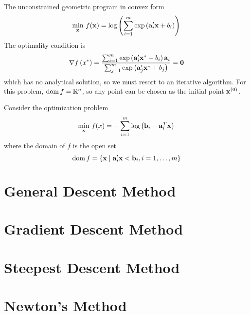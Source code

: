 \begin{example}
	The unconstrained geometric program in convex form
	\begin{equation*}
		\min_{{\bf x}}\,f({\bf x})=\log \left(\sum_{i=1}^{m}\exp\left({\bf a}_{i}^{\prime}{\bf x}+b_{i}\right)\right)
	\end{equation*}
	The optimality condition is
	\begin{equation*}
		\nabla f\left(x^{*}\right)=\frac{\sum_{i=1}^{m}\exp\left({\bf a}_{i}^{\prime}{\bf x}^{*}+b_{i}\right){\bf a}_{i}}{\sum_{j=1}^{m}\exp\left({\bf a}_{j}^{\prime}{\bf x}^{*}+b_{j}\right)}=\mathbf{0}
	\end{equation*}
	which has no analytical solution, so we must resort to an iterative algorithm. For this problem, $\operatorname{dom} f={\mathbb R}^{n}$, so any point can be chosen as the initial point ${\bf x}^{(0)}$.
\end{example}

\begin{example}
	Consider the optimization problem
	\begin{equation*}
		\min_{{\bf x}}\,f(x)=-\sum_{i=1}^{m}\log\left({\bf b}_{i}-{\bf a}_{i}^{T}{\bf x}\right)
	\end{equation*}
	where the domain of $f$ is the open set
	\begin{equation*}
		\operatorname{dom}f=\left\{{\bf x}\mid{\bf a}_{i}^{\prime}{\bf x}<{\bf b}_{i},i=1,\ldots,m\right\}
	\end{equation*}
\end{example}

\begin{definition}

\end{definition}

\section{General Descent Method}

\section{Gradient Descent Method}

\section{Steepest Descent Method}

\section{Newton's Method}

